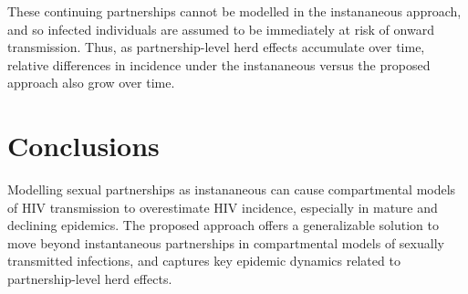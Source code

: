 These continuing partnerships cannot be modelled in the instananeous approach,
and so infected individuals are assumed to be immediately at risk of onward transmission.
Thus, as partnership-level herd effects accumulate over time,
relative differences in incidence under the instananeous versus the proposed approach
also grow over time.
\section{Conclusions}
Modelling sexual partnerships as instananeous can cause
compartmental models of HIV transmission to overestimate HIV incidence,
especially in mature and declining epidemics.
The proposed approach offers a generalizable solution to move beyond instantaneous partnerships
in compartmental models of sexually transmitted infections,
and captures key epidemic dynamics related to partnership-level herd effects.
